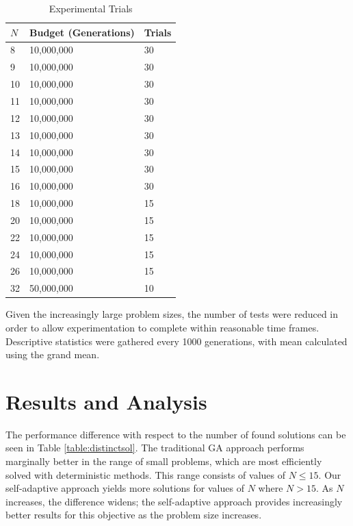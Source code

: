 \documentclass[conference]{IEEEtran}
\begin{document}
\begin{table}
\centering
\caption{Experimental Trials}
\begin{tabular}{|l|l|l|} \hline
$N$&        Budget (Generations)&     Trials \\ \hline
8&          10,000,000&         30 \\ \hline
9&          10,000,000&         30 \\ \hline
10&         10,000,000&         30 \\ \hline
11&         10,000,000&         30 \\ \hline
12&         10,000,000&         30 \\ \hline
13&         10,000,000&         30 \\ \hline
14&         10,000,000&         30 \\ \hline
15&         10,000,000&         30 \\ \hline
16&         10,000,000&         30 \\ \hline
18&         10,000,000&         15 \\ \hline
20&         10,000,000&         15 \\ \hline
22&         10,000,000&         15 \\ \hline
24&         10,000,000&         15 \\ \hline
26&         10,000,000&         15 \\ \hline
32&         50,000,000&         10 \\ \hline
\end{tabular}
\label{table:trials}
\end{table}

Given the increasingly large problem sizes, the number of tests were reduced in order to allow experimentation to complete within reasonable time frames. Descriptive statistics were gathered every 1000 generations, with mean calculated using the grand mean.

\section{Results and Analysis}
The performance difference with respect to the number of found solutions can be seen in Table \ref{table:distinctsol}. The traditional GA approach performs marginally better in the range of small problems, which are most efficiently solved with deterministic methods. This range consists of values of $N \leq 15$. Our self-adaptive approach yields more solutions for values of $N$ where $N > 15$. As $N$ increases, the difference widens; the self-adaptive approach provides increasingly better results for this objective as the problem size increases.
\end{document}

